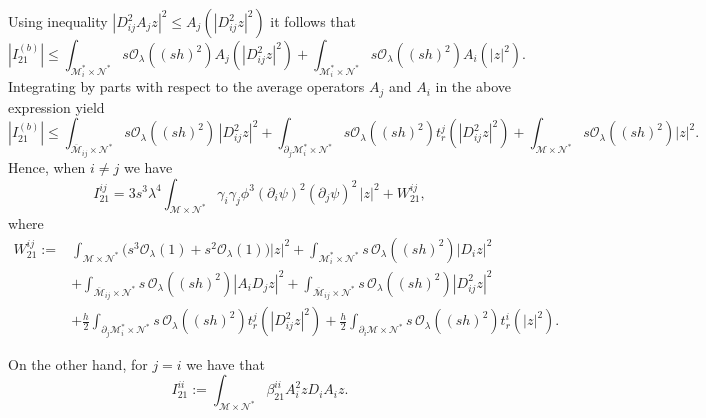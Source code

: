 \documentclass[11pt,oneside,leqno]{amsart}
\numberwithin{equation}{section}
\numberwithin{equation}{section}
\begin{document}
Using inequality $|D_{ij}^{2}A_{j}z|^{2}\leq A_{j}(|D_{ij}^{2}z|^{2})$ it follows that
\begin{equation}
|I_{21}^{(b)}|\leq\int_{\mathcal{M}_{i}^{\ast}\times\mathcal{N}^{\ast}}s\mathcal{O}_{\lambda}((sh)^{2})A_{j}(|D_{ij}^{2}z|^{2})+\int_{\mathcal{M}_{i}^{\ast}\times\mathcal{N}^{\ast}}s\mathcal{O}_{\lambda}((sh)^{2})A_{i}(|z|^{2}).
\end{equation}
Integrating by parts with respect to the average operators $A_{j}$ and $A_{i}$ in the above expression yield
\begin{equation}
|I_{21}^{(b)}|\leq\int_{\overline{\mathcal{M}}_{ij}\times\mathcal{N}^{\ast}}s\mathcal{O}_{\lambda}((sh)^{2})\,|D_{ij}^{2}z|^{2}+\int_{\partial_{j}\mathcal{M}_{i}^{\ast}\times\mathcal{N}^{\ast}}s\mathcal{O}_{\lambda}((sh)^{2})t_{r}^{j}(|D_{ij}^{2}z|^{2})+\int_{\mathcal{M}\times\mathcal{N}^{\ast}}s\mathcal{O}_{\lambda}((sh)^{2})|z|^{2}.
\end{equation}
Hence, when $i\ne j$ we have
\begin{equation}\label{eq:I21:ij:final}
I_{21}^{ij}=3s^{3}\lambda^{4}\int_{\mathcal{M}\times\mathcal{N}^{\ast}}\gamma_{i}\gamma_{j}\phi^{3}(\partial_{i}\psi)^{2}(\partial_{j}\psi)^{2}\,|z|^{2}+W_{21}^{ij},
\end{equation}
where 
\begin{equation}\label{eq:W21:ij:full}
\begin{aligned}
W_{21}^{ij}:=&\int_{\mathcal{M}\times\mathcal{N}^{\ast}}\Big(s^{3}\mathcal{O}_{\lambda}(1)+s^{2}\mathcal{O}_{\lambda}(1)\Big)|z|^{2}+\int_{\mathcal{M}_{i}^{\ast}\times\mathcal{N}^{\ast}}s\,\mathcal{O}_{\lambda}((sh)^{2})|D_{i}z|^{2}\\
&+\int_{\overline{\mathcal{M}}_{ij}\times\mathcal{N}^{\ast}}s\,\mathcal{O}_{\lambda}((sh)^{2})|A_{i}D_{j}z|^{2}+\int_{\overline{\mathcal{M}}_{ij}\times\mathcal{N}^{\ast}}s\,\mathcal{O}_{\lambda}((sh)^{2})|D_{ij}^{2}z|^{2}\\
&+\frac{h}{2}\int_{\partial_{j}\mathcal{M}_{i}^{\ast}\times\mathcal{N}^{\ast}}s\,\mathcal{O}_{\lambda}((sh)^{2})t_{r}^{j}(|D_{ij}^{2}z|^{2})+\frac{h}{2}\int_{\partial_{i}\mathcal{M}\times\mathcal{N}^{\ast}}s\,\mathcal{O}_{\lambda}((sh)^{2})t_{r}^{i}(|z|^{2}).
\end{aligned}
\end{equation}
\par On the other hand, for $j=i$ we have that
\begin{equation*}
I_{21}^{ii}:=\int_{\mathcal{M}\times\mathcal{N}^{\ast}}\beta_{21}^{ii}A_{i}^{2}zD_{i}A_{i}z.
\end{equation*}
\end{document}
